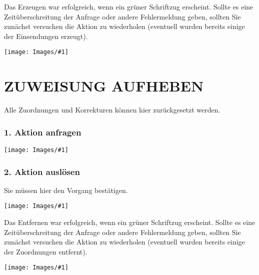 \documentclass[12pt,a4paper,final]{scrartcl}
\numberwithin{equation}{section}
\newenvironment{Bilder}
  {\par\raggedbottom\null\noindent\minipage{\textwidth}\centering}
  {\endminipage\vspace{0.7cm}}
\newcommand{\tbild}[1]{%
\begin{Bilder}
 \texttt{[image: Images/\#1]}
	\end{Bilder}
}
\begin{document}
Das Erzeugen war erfolgreich, wenn ein grüner Schriftzug erscheint. Sollte es eine Zeitüberschreitung der Anfrage oder andere Fehlermeldung geben, sollten Sie zunächst versuchen die Aktion zu wiederholen (eventuell wurden bereits einige der Einsendungen erzeugt).
\tbild{makeC.png}

\newpage
\section{ZUWEISUNG AUFHEBEN}
Alle Zuordnungen und Korrekturen können hier zurückgesetzt werden.
\subsubsection*{1. Aktion anfragen}
\tbild{removeA.png}

\subsubsection*{2. Aktion auslösen}
Sie müssen hier den Vorgang bestätigen.
\tbild{removeB.png}

Das Entfernen war erfolgreich, wenn ein grüner Schriftzug erscheint. Sollte es eine Zeitüberschreitung der Anfrage oder andere Fehlermeldung geben, sollten Sie zunächst versuchen die Aktion zu wiederholen (eventuell wurden bereits einige der Zuordnungen entfernt).
\tbild{removeC.png}
\end{document}
